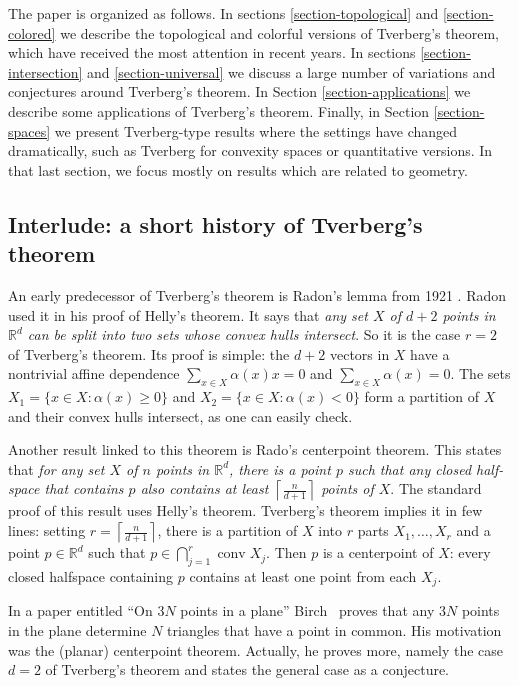 \documentclass[11pt]{article}
\newcommand{\rr}{\mathbb{R}}
\newcommand{\al}{\alpha}
\DeclareMathOperator{\conv}{conv}
\begin{document}
The paper is organized as follows.  In sections \ref{section-topological} and \ref{section-colored} we describe the topological and colorful versions of Tverberg's theorem, which have received the most attention in recent years.  In sections \ref{section-intersection} and \ref{section-universal} we discuss a large number of variations and conjectures around Tverberg's theorem.  In Section \ref{section-applications} we describe some applications of Tverberg's theorem.  Finally, in Section \ref{section-spaces} we present Tverberg-type results where the settings have changed dramatically, such as Tverberg for convexity spaces or quantitative versions.  In that last section, we focus mostly on results which are related to geometry.

\subsection{Interlude: a short history of Tverberg's theorem}
An early predecessor of Tverberg's theorem is Radon's lemma from 1921 \cite{Radon:1921vh, Eckhoff:1979bi}. Radon used it in his proof of Helly's theorem. It says that \textit{any set $X$ of $d+2$ points in $\rr^d$ can be split into two sets whose convex hulls intersect}. So it is the case $r=2$ of Tverberg's theorem. Its proof is simple: the $d+2$ vectors in $X$ have a nontrivial affine dependence $\sum_{x \in X}\al(x)x=0$ and  $\sum_{x \in X}\al(x)=0$. The sets $X_1=\{x \in X: \al(x)\ge 0\}$ and $X_2=\{x \in X: \al(x) < 0\}$ form a partition of $X$ and their convex hulls intersect, as one can easily check.

Another result linked to this theorem is Rado's centerpoint theorem.  This states that \textit{for any set $X$ of $n$ points in $\rr^d$, there is a point $p$ such that any closed half-space that contains $p$ also contains at least $\left\lceil \frac{n}{d+1}\right\rceil$ points of $X$}. The standard proof of this result uses Helly's theorem. Tverberg's theorem implies it in few lines: setting $r=\left\lceil \frac{n}{d+1}\right\rceil$, there is a partition of $X$ into $r$ parts $X_1,\ldots,X_r$ and a point $p\in \rr^d$ such that $p \in \bigcap_{j=1}^r \conv X_j$. Then $p$ is a centerpoint of $X$: every closed halfspace containing $p$ contains at least one point from each $X_j$.

In a paper entitled ``On $3N$ points in a plane'' Birch~\cite{Birch:1959} proves that any $3N$ points in the plane determine $N$ triangles that have a point in common. His motivation was the (planar) centerpoint theorem. Actually, he proves more, namely the case $d=2$ of Tverberg's theorem and states the general case as a conjecture.
\end{document}
